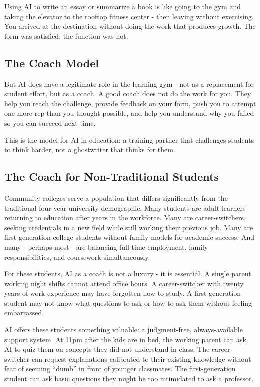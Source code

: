 \documentclass[
  letterpaper,
  DIV=11,
  numbers=noendperiod]{scrreprt}
\begin{document}
Using AI to write an essay or summarize a book is like going to the gym
and taking the elevator to the rooftop fitness center - then leaving
without exercising. You arrived at the destination without doing the
work that produces growth. The form was satisfied; the function was not.

\subsection{The Coach Model}\label{the-coach-model}

But AI does have a legitimate role in the learning gym - not as a
replacement for student effort, but as a coach. A good coach does not do
the work for you. They help you reach the challenge, provide feedback on
your form, push you to attempt one more rep than you thought possible,
and help you understand why you failed so you can succeed next time.

This is the model for AI in education: a training partner that
challenges students to think harder, not a ghostwriter that thinks for
them.

\subsection{The Coach for Non-Traditional
Students}\label{the-coach-for-non-traditional-students}

Community colleges serve a population that differs significantly from
the traditional four-year university demographic. Many students are
adult learners returning to education after years in the workforce. Many
are career-switchers, seeking credentials in a new field while still
working their previous job. Many are first-generation college students
without family models for academic success. And many - perhaps most -
are balancing full-time employment, family responsibilities, and
coursework simultaneously.

For these students, AI as a coach is not a luxury - it is essential. A
single parent working night shifts cannot attend office hours. A
career-switcher with twenty years of work experience may have forgotten
how to study. A first-generation student may not know what questions to
ask or how to ask them without feeling embarrassed.

AI offers these students something valuable: a judgment-free,
always-available support system. At 11pm after the kids are in bed, the
working parent can ask AI to quiz them on concepts they did not
understand in class. The career-switcher can request explanations
calibrated to their existing knowledge without fear of seeming ``dumb''
in front of younger classmates. The first-generation student can ask
basic questions they might be too intimidated to ask a professor.
\end{document}
